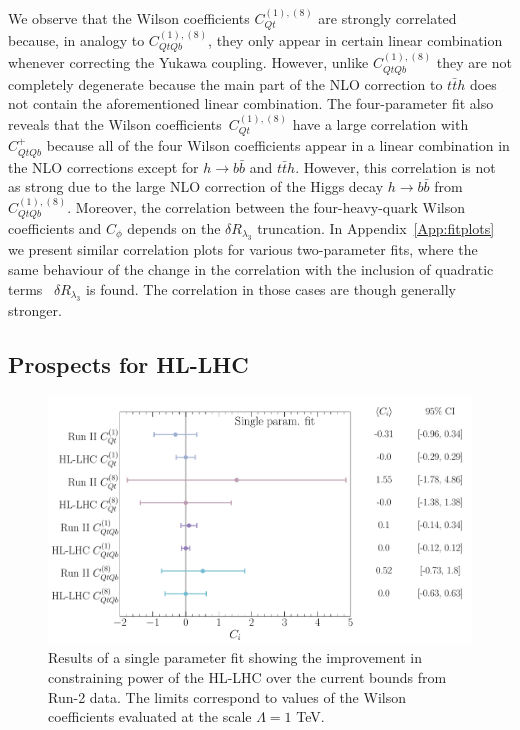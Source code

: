 We observe that the Wilson coefficients $C_{Qt}^{(1),(8) }$ are strongly correlated because, in analogy to $C_{QtQb}^{(1),(8) }$, they only appear in  certain linear combination whenever correcting the Yukawa coupling. However,  unlike $C_{QtQb}^{(1),(8) }$ they are not completely degenerate because the main part of the NLO correction to $t\bar t h$ does not contain the aforementioned linear combination.  The four-parameter fit also reveals that the Wilson coefficients~$C_{Qt}^{(1),(8) }$ have a large correlation with ~$C_{QtQb}^{+}$ because all of the four Wilson coefficients appear in a linear combination in the NLO corrections except for $ h\to b\bar b$ and $ t\bar{t} h$. However, this correlation is not as strong due to the large NLO correction of the Higgs decay $h \to b \bar b$ from ~$C_{QtQb}^{(1),(8) }$. Moreover, the correlation between the four-heavy-quark Wilson coefficients  and $C_{\phi}$ depends on the $\delta R_{\lambda_3}$ truncation. In Appendix~\ref{App:fitplots}  we present similar correlation plots for various two-parameter fits, where the same behaviour of the change in the correlation with the inclusion of quadratic terms ~$\delta R_{\lambda_3}$ is found. The correlation in those cases are though generally stronger.
\subsection{Prospects for HL-LHC}
\begin{figure}[t!]
	\begin{center}
		\includegraphics[width=0.75\linewidth]{fig/uebeblick_forest_ci}
	\end{center}
	\caption{ Results of a single parameter fit showing the improvement in constraining power of the HL-LHC over the current bounds from Run-2 data. The limits correspond to values of the Wilson coefficients evaluated at the scale $\Lambda=1$ TeV. \label{fig:HLLHC} }
\end{figure}

